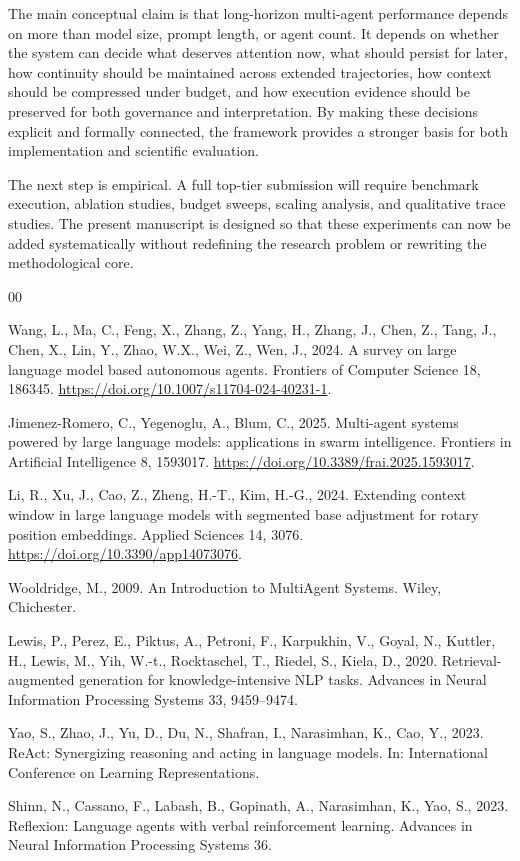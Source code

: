 \documentclass[a4paper,fleqn]{cas-sc}
\begin{document}
The main conceptual claim is that long-horizon multi-agent performance depends on more than model size, prompt length, or agent count. It depends on whether the system can decide what deserves attention now, what should persist for later, how continuity should be maintained across extended trajectories, how context should be compressed under budget, and how execution evidence should be preserved for both governance and interpretation. By making these decisions explicit and formally connected, the framework provides a stronger basis for both implementation and scientific evaluation.

The next step is empirical. A full top-tier submission will require benchmark execution, ablation studies, budget sweeps, scaling analysis, and qualitative trace studies. The present manuscript is designed so that these experiments can now be added systematically without redefining the research problem or rewriting the methodological core.

\begin{thebibliography}{00}

Wang, L., Ma, C., Feng, X., Zhang, Z., Yang, H., Zhang, J., Chen, Z., Tang, J., Chen, X., Lin, Y., Zhao, W.X., Wei, Z., Wen, J., 2024. A survey on large language model based autonomous agents. Frontiers of Computer Science 18, 186345. \url{https://doi.org/10.1007/s11704-024-40231-1}.

Jimenez-Romero, C., Yegenoglu, A., Blum, C., 2025. Multi-agent systems powered by large language models: applications in swarm intelligence. Frontiers in Artificial Intelligence 8, 1593017. \url{https://doi.org/10.3389/frai.2025.1593017}.

Li, R., Xu, J., Cao, Z., Zheng, H.-T., Kim, H.-G., 2024. Extending context window in large language models with segmented base adjustment for rotary position embeddings. Applied Sciences 14, 3076. \url{https://doi.org/10.3390/app14073076}.

Wooldridge, M., 2009. An Introduction to MultiAgent Systems. Wiley, Chichester.

Lewis, P., Perez, E., Piktus, A., Petroni, F., Karpukhin, V., Goyal, N., Kuttler, H., Lewis, M., Yih, W.-t., Rocktaschel, T., Riedel, S., Kiela, D., 2020. Retrieval-augmented generation for knowledge-intensive NLP tasks. Advances in Neural Information Processing Systems 33, 9459--9474.

Yao, S., Zhao, J., Yu, D., Du, N., Shafran, I., Narasimhan, K., Cao, Y., 2023. ReAct: Synergizing reasoning and acting in language models. In: International Conference on Learning Representations.

Shinn, N., Cassano, F., Labash, B., Gopinath, A., Narasimhan, K., Yao, S., 2023. Reflexion: Language agents with verbal reinforcement learning. Advances in Neural Information Processing Systems 36.

\end{thebibliography}
\end{document}
